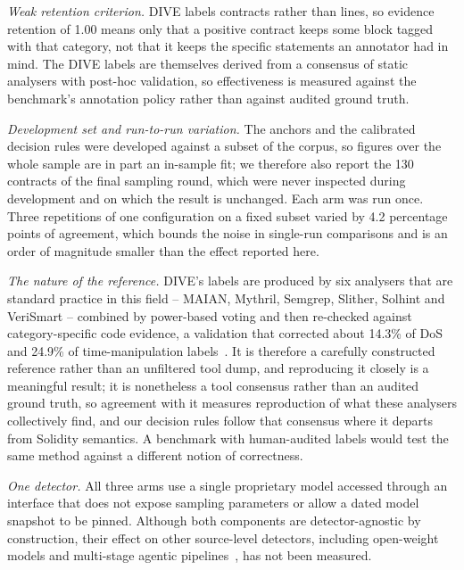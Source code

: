 \documentclass{ieeeaccess}
\begin{document}
\smallskip
\noindent\emph{Weak retention criterion.} DIVE labels contracts rather than lines, so evidence retention of 1.00 means only that a positive contract keeps some block tagged with that category, not that it keeps the specific statements an annotator had in mind. The DIVE labels are themselves derived from a consensus of static analysers with post-hoc validation, so effectiveness is measured against the benchmark's annotation policy rather than against audited ground truth.

\smallskip
\noindent\emph{Development set and run-to-run variation.} The anchors and the calibrated decision rules were developed against a subset of the corpus, so figures over the whole sample are in part an in-sample fit; we therefore also report the 130 contracts of the final sampling round, which were never inspected during development and on which the result is unchanged. Each arm was run once. Three repetitions of one configuration on a fixed subset varied by 4.2 percentage points of agreement, which bounds the noise in single-run comparisons and is an order of magnitude smaller than the effect reported here.

\smallskip
\noindent\emph{The nature of the reference.} DIVE's labels are produced by six analysers that are standard practice in this field -- MAIAN, Mythril, Semgrep, Slither, Solhint and VeriSmart -- combined by power-based voting and then re-checked against category-specific code evidence, a validation that corrected about 14.3\% of DoS and 24.9\% of time-manipulation labels~\cite{dive2026}. It is therefore a carefully constructed reference rather than an unfiltered tool dump, and reproducing it closely is a meaningful result; it is nonetheless a tool consensus rather than an audited ground truth, so agreement with it measures reproduction of what these analysers collectively find, and our decision rules follow that consensus where it departs from Solidity semantics. A benchmark with human-audited labels would test the same method against a different notion of correctness.

\smallskip
\noindent\emph{One detector.} All three arms use a single proprietary model accessed through an interface that does not expose sampling parameters or allow a dated model snapshot to be pinned. Although both components are detector-agnostic by construction, their effect on other source-level detectors, including open-weight models and multi-stage agentic pipelines~\cite{ma2025iaudit}, has not been measured.

\end{document}
